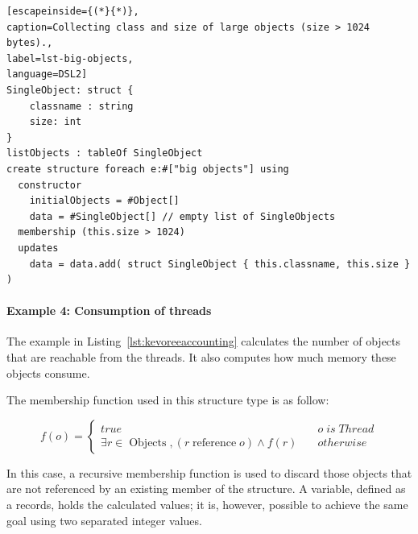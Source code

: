 \begin{lstlisting}[escapeinside={(*}{*)},
caption=Collecting class and size of large objects (size > 1024 bytes)., 
label=lst-big-objects,
language=DSL2]
SingleObject: struct {
	classname : string
	size: int
}
listObjects : tableOf SingleObject
create structure foreach e:#["big objects"] using
  constructor
    initialObjects = #Object[]
    data = #SingleObject[] // empty list of SingleObjects
  membership (this.size > 1024)
  updates
    data = data.add( struct SingleObject { this.classname, this.size } )
\end{lstlisting}
%
%

\paragraph{Example 4: Consumption of threads}
The example in Listing~\ref{lst:kevoreeaccounting} calculates the number of objects that are reachable from the threads.
It also computes how much memory these objects consume.

The membership function used in this structure type is as follow:

\[
	f\left( o \right) = \begin{cases}
	true & \quad o \; is \; Thread \\
	\exists {r \in \operatorname{Objects}}, (r \operatorname{reference} o) \wedge f(r)  & \quad otherwise
	\end{cases}
\] 

In this case, a recursive membership function is used to discard those objects that are not referenced by an existing member of the structure.
A variable, defined as a records, holds the  calculated values; it is, however, possible to achieve the same goal using two separated integer values.

